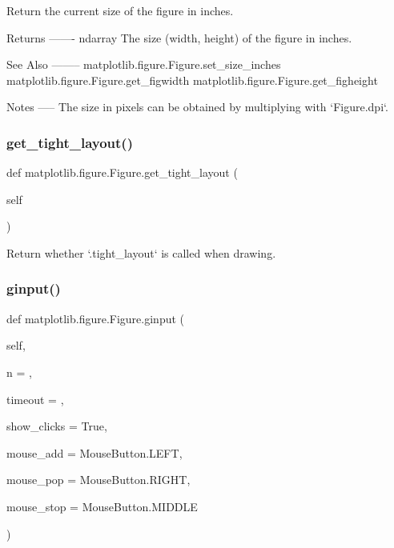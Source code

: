 \begin{DoxyVerb}Return the current size of the figure in inches.

Returns
-------
ndarray
   The size (width, height) of the figure in inches.

See Also
--------
matplotlib.figure.Figure.set_size_inches
matplotlib.figure.Figure.get_figwidth
matplotlib.figure.Figure.get_figheight

Notes
-----
The size in pixels can be obtained by multiplying with `Figure.dpi`.
\end{DoxyVerb}
 \mbox{\label{classmatplotlib_1_1figure_1_1Figure_a1b093e80246da4b833fdb0bd589760a3}} 
\subsubsection{\texorpdfstring{get\+\_\+tight\+\_\+layout()}{get\_tight\_layout()}}
{\footnotesize\ttfamily def matplotlib.\+figure.\+Figure.\+get\+\_\+tight\+\_\+layout (\begin{DoxyParamCaption}\item[{}]{self }\end{DoxyParamCaption})}

\begin{DoxyVerb}Return whether `.tight_layout` is called when drawing.\end{DoxyVerb}
 \mbox{\label{classmatplotlib_1_1figure_1_1Figure_ab58d16759405fcc53d3da1633daff3d0}} 
\subsubsection{\texorpdfstring{ginput()}{ginput()}}
{\footnotesize\ttfamily def matplotlib.\+figure.\+Figure.\+ginput (\begin{DoxyParamCaption}\item[{}]{self,  }\item[{}]{n = {},  }\item[{}]{timeout = {},  }\item[{}]{show\+\_\+clicks = {\ttfamily True},  }\item[{}]{mouse\+\_\+add = {\ttfamily MouseButton.LEFT},  }\item[{}]{mouse\+\_\+pop = {\ttfamily MouseButton.RIGHT},  }\item[{}]{mouse\+\_\+stop = {\ttfamily MouseButton.MIDDLE} }\end{DoxyParamCaption})}

